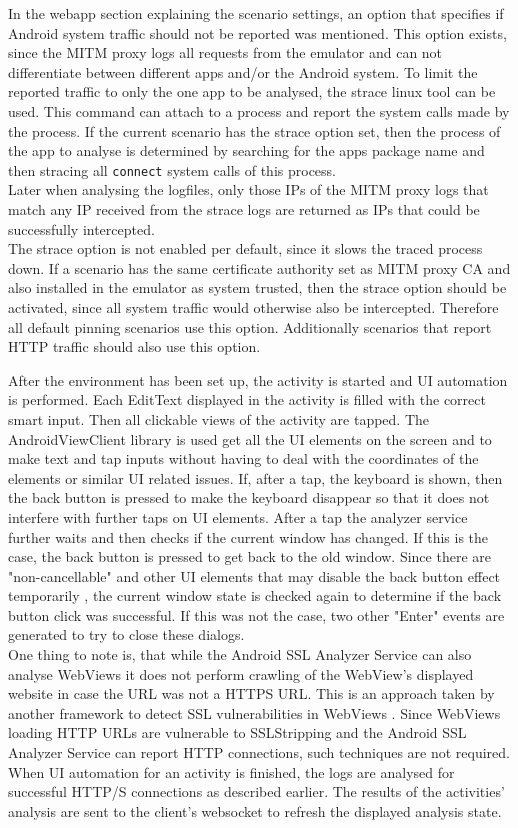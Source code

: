 \documentclass[draft,final]{vutinfth} %
\begin{document}
In the webapp section explaining the scenario settings, an option that specifies if Android system traffic should not be reported was mentioned. This option exists, since the MITM proxy logs all requests from the emulator and can not differentiate between different apps and/or the Android system. To limit the reported traffic to only the one app to be analysed, the strace linux tool can be used. This command can attach to a process and report the system calls made by the process. If the current scenario has the strace option set, then the process of the app to analyse is determined by searching for the apps package name and then stracing all \texttt{connect} system calls of this process.\\
Later when analysing the logfiles, only those IPs of the MITM proxy logs that match any IP received from the strace logs are returned as IPs that could be successfully intercepted.\\
The strace option is not enabled per default, since it slows the traced process down. If a scenario has the same certificate authority set as MITM proxy CA and also installed in the emulator as system trusted, then the strace option should be activated, since all system traffic would otherwise also be intercepted. Therefore all default pinning scenarios use this option. Additionally scenarios that report HTTP traffic should also use this option.

After the environment has been set up, the activity is started and UI automation is performed. Each EditText displayed in the activity is filled with the correct smart input. Then all clickable views of the activity are tapped. The AndroidViewClient library \cite{AndroidViewClient} is used get all the UI elements on the screen and to make text and tap inputs without having to deal with the coordinates of the elements or similar UI related issues. If, after a tap, the keyboard is shown, then the back button is pressed to make the keyboard disappear so that it does not interfere with further taps on UI elements. After a tap the analyzer service further waits and then checks if the current window has changed. If this is the case, the back button is pressed to get back to the old window. Since there are "non-cancellable" and other UI elements that may disable the back button effect temporarily \cite{Sounthiraraj}, the current window state is checked again to determine if  the back button click was successful. If this was not the case, two other "Enter" events are generated to try to close these dialogs.\\
One thing to note is, that while the Android SSL Analyzer Service can also analyse WebViews it does not perform crawling of the WebView's displayed website in case the URL was not a HTTPS URL. This is an approach taken by another framework to detect SSL vulnerabilities in WebViews \cite{Zuo}. Since WebViews loading HTTP URLs are vulnerable to SSLStripping and the Android SSL Analyzer Service can report HTTP connections, such techniques are not required.\\
When UI automation for an activity is finished, the logs are analysed for successful HTTP/S connections as described earlier. The results of the activities' analysis are sent to the client's websocket to refresh the displayed analysis state.
\end{document}

